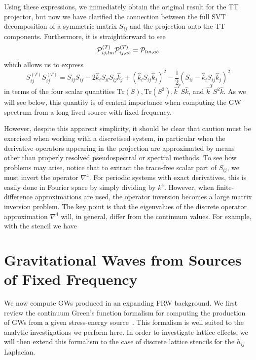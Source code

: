 \documentclass{revtex4}
\begin{document}
Using these expressions, we immediately obtain the original result for the TT projector,
but now we have clarified the connection between the full SVT decomposition of a symmetric matrix $S_{ij}$ and the projection onto the TT components.
Furthermore, it is straightforward to see
\begin{equation}
  \mathcal{P}_{ij,lm}^{(T)}\mathcal{P}_{ij,ab}^{(T)} = \mathcal{P}_{lm,ab}
\end{equation}
which allows us to express
\begin{equation}
  S_{ij}^{(T)}S_{ij}^{(T)} = S_{ij}S_{ij} - 2\hat{k}_iS_{il}S_{lj}\hat{k}_j + \left(\hat{k}_iS_{ij}\hat{k}_j\right)^2 - \frac{1}{2}\left(S_{ii}-\hat{k}_iS_{ij}\hat{k}_j\right)^2
\end{equation}
in terms of the four scalar quantities $\mathrm{Tr}(S), \mathrm{Tr}(S^2), \hat{k}^TS\hat{k}$, and $\hat{k}^TS^2\hat{k}$.
As we will see below, this quantity is of central importance when computing the GW spectrum from a long-lived source with fixed frequency.

However, despite this apparent simplicity, it should be clear that caution must be exercised when working with a discretised system, in particular when the derivative operators appearing in the projection are approximated by means other than properly resolved pseudospectral or spectral methods.
To see how problems may arise, notice that to extract the trace-free scalar part of $S_{ij}$, we must invert the operator $\nabla^4$.
For periodic systems with exact derivatives, this is easily done in Fourier space by simply dividing by $k^4$.
However, when finite-difference approximations are used, the operator inversion becomes a large matrix inversion problem.
The key point is that the eigenvalues of the discrete operator approximation $\nabla^4$ will, in general, differ from the continuum values.
For example, with the stencil
we have

\section{Gravitational Waves from Sources of Fixed Frequency}
We now compute GWs produced in an expanding FRW background.
We first review the continuum Green's function formalism for computing the production of GWs from a given stress-energy source~\cite{Dufaux:2007pt}.
This formalism is well suited to the analytic investigations we perform here.
In order to investigate lattice effects, we will then extend this formalism to the case of discrete lattice stencils for the $h_{ij}$ Laplacian.
\end{document}
